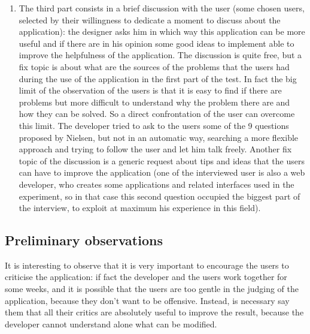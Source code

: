 \begin{enumerate}
\item 
The third part consists in a brief discussion with the user (some chosen users, selected by their willingness to dedicate a moment to discuss about the application): the designer asks him in which way this application can be more useful and if there are in his opinion some good ideas to implement able to improve the helpfulness of the application. The discussion is quite free, but a fix topic is about what are the sources of the problems that the users had during the use of the application in the first part of the test. In fact the big limit of the observation of the users is that it is easy to find if there are problems but more difficult to understand why the problem there are and how they can be solved. So a direct confrontation of the user can overcome this limit. 
The developer tried to ask to the users some of the 9 questions proposed by Nielsen, but not in an automatic way, searching a more flexible approach and trying to follow the user and let him talk freely.
Another fix topic of the discussion is a generic request about tips and ideas that the users can have to improve the application (one of the interviewed user is also a web developer, who creates some applications and related interfaces used in the experiment, so in that case this second question occupied the biggest part of the interview, to exploit at maximum his experience in this field). 

\end{enumerate} 

\subsection{Preliminary observations}
It is interesting to observe that it is very important to encourage the users to criticise the application: if fact the developer and the users work together for some weeks, and it is possible that the users are too gentle in the judging of the application, because they don't want to be offensive. Instead, is necessary say them that all their critics are absolutely useful to improve the result, because the developer cannot understand alone what can be modified. 
 

